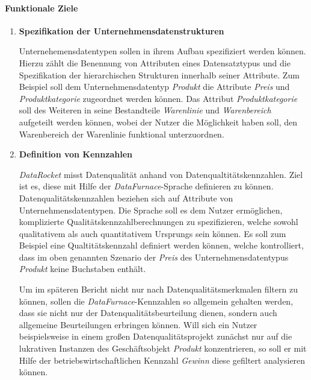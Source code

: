 \documentclass[
  language=german, %
  type=bachelor%
]{isthesis}
\begin{document}
\begin{content}
  \paragraph{Funktionale Ziele}
    \begin{enumerate}
      \item \textbf{Spezifikation der Unternehmensdatenstrukturen} 

        Unternehemensdatentypen sollen in ihrem Aufbau spezifiziert werden
        können. Hierzu zählt die Benennung von Attributen eines Datensatztypus
        und die Spezifikation der hierarchischen Strukturen innerhalb seiner
        Attribute. Zum Beispiel soll dem Unternehmensdatentyp \textit{Produkt}
        die Attribute \textit{Preis} und \textit{Produktkategorie} zugeordnet
        werden können. Das Attribut \textit{Produktkategorie} soll des Weiteren
        in seine Bestandteile \textit{Warenlinie} und \textit{Warenbereich}
        aufgeteilt werden können, wobei der Nutzer die Möglichkeit haben soll,
        den Warenbereich der Warenlinie funktional unterzuordnen.

      \item \textbf{Definition von Kennzahlen} 

        \textit{DataRocket} misst Datenqualität anhand von
        Datenqualtitätskennzahlen. Ziel ist es, diese mit Hilfe der
        \textit{DataFurnace}-Sprache definieren zu können.
        Datenqualitätskennzahlen beziehen sich auf Attribute von
        Unternehmensdatentypen. Die Sprache soll es dem Nutzer ermöglichen,
        komplizierte Qualitätskennzahlberechnungen zu spezifizieren, welche
        sowohl qualitativem als auch quantitativem Ursprungs sein können. Es
        soll zum Beispiel eine Qualtitätskennzahl definiert werden können,
        welche kontrolliert, dass im oben genannten Szenario der \textit{Preis}
        des Unternehmensdatentypus \textit{Produkt} keine Buchstaben enthält.

        Um im späteren Bericht nicht nur nach Datenqualitätsmerkmalen filtern
        zu können, sollen die \textit{DataFurnace}-Kennzahlen so allgemein
        gehalten werden, dass sie nicht nur der Datenqualitätsbeurteilung
        dienen, sondern auch allgemeine Beurteilungen erbringen können. Will
        sich ein Nutzer beispielsweise in einem großen Datenqualitätsprojekt
        zunächst nur auf die lukrativen Instanzen des Geschäftsobjekt
        \textit{Produkt} konzentrieren, so soll er mit Hilfe der
        betriebswirtschaftlichen Kennzahl \textit{Gewinn} diese gefiltert
        analysieren können.
        

\end{enumerate}
\end{content}
\end{document}
